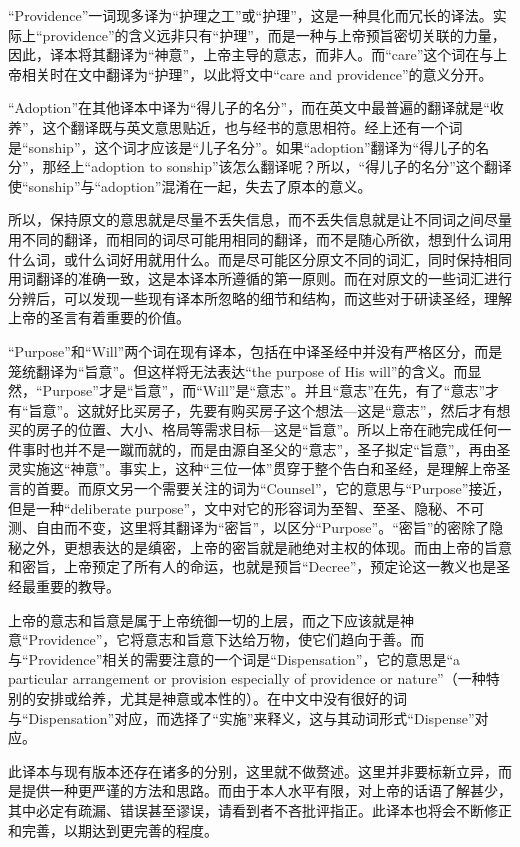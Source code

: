 \documentclass[12pt, a4paper, oneside]{ctexart}
\begin{document}
“Providence”一词现多译为“护理之工”或“护理”，这是一种具化而冗长的译法。实际上“providence”的含义远非只有“护理”，而是一种与上帝预旨密切关联的力量，因此，译本将其翻译为“神意”，上帝主导的意志，而非人。而“care”这个词在与上帝相关时在文中翻译为“护理”，以此将文中“care and providence”的意义分开。

“Adoption”在其他译本中译为“得儿子的名分”，而在英文中最普遍的翻译就是“收养”，这个翻译既与英文意思贴近，也与经书的意思相符。经上还有一个词是“sonship”，这个词才应该是“儿子名分”。如果“adoption”翻译为“得儿子的名分”，那经上“adoption to sonship”该怎么翻译呢？所以，“得儿子的名分”这个翻译使“sonship”与“adoption”混淆在一起，失去了原本的意义。

所以，保持原文的意思就是尽量不丢失信息，而不丢失信息就是让不同词之间尽量用不同的翻译，而相同的词尽可能用相同的翻译，而不是随心所欲，想到什么词用什么词，或什么词好用就用什么。而是尽可能区分原文不同的词汇，同时保持相同用词翻译的准确一致，这是本译本所遵循的第一原则。而在对原文的一些词汇进行分辨后，可以发现一些现有译本所忽略的细节和结构，而这些对于研读圣经，理解上帝的圣言有着重要的价值。

“Purpose”和“Will”两个词在现有译本，包括在中译圣经中并没有严格区分，而是笼统翻译为“旨意”。但这样将无法表达“the purpose of His will”的含义。而显然，“Purpose”才是“旨意”，而“Will”是“意志”。并且“意志”在先，有了“意志”才有“旨意”。这就好比买房子，先要有购买房子这个想法---这是“意志”，然后才有想买的房子的位置、大小、格局等需求目标---这是“旨意”。所以上帝在祂完成任何一件事时也并不是一蹴而就的，而是由源自圣父的“意志”，圣子拟定“旨意”，再由圣灵实施这“神意”。事实上，这种“三位一体”贯穿于整个告白和圣经，是理解上帝圣言的首要。而原文另一个需要关注的词为“Counsel”，它的意思与“Purpose”接近，但是一种“deliberate purpose”，文中对它的形容词为至智、至圣、隐秘、不可测、自由而不变，这里将其翻译为“密旨”，以区分“Purpose”。“密旨”的密除了隐秘之外，更想表达的是缜密，上帝的密旨就是祂绝对主权的体现。而由上帝的旨意和密旨，上帝预定了所有人的命运，也就是预旨“Decree”，预定论这一教义也是圣经最重要的教导。

上帝的意志和旨意是属于上帝统御一切的上层，而之下应该就是神意“Providence”，它将意志和旨意下达给万物，使它们趋向于善。而与“Providence”相关的需要注意的一个词是“Dispensation”，它的意思是“a particular arrangement or provision especially of providence or nature”（一种特别的安排或给养，尤其是神意或本性的）。在中文中没有很好的词与“Dispensation”对应，而选择了“实施”来释义，这与其动词形式“Dispense”对应。

此译本与现有版本还存在诸多的分别，这里就不做赘述。这里并非要标新立异，而是提供一种更严谨的方法和思路。而由于本人水平有限，对上帝的话语了解甚少，其中必定有疏漏、错误甚至谬误，请看到者不吝批评指正。此译本也将会不断修正和完善，以期达到更完善的程度。
\end{document}
